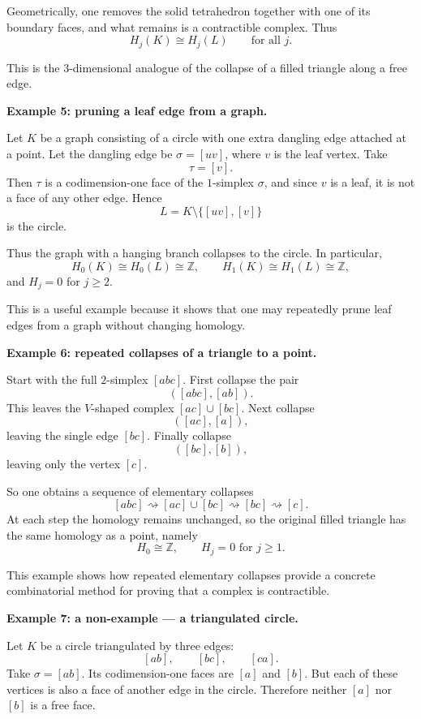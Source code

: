 \documentclass[12pt,a4paper]{article}
\theoremstyle{notespace}
\begin{document}
Geometrically, one removes the solid tetrahedron together with one of its boundary faces, and what remains is a contractible complex. Thus
\[
H_j(K)\cong H_j(L)
\qquad\text{for all } j.
\]

This is the \(3\)-dimensional analogue of the collapse of a filled triangle along a free edge.

\medskip

\textbf{Example 5: pruning a leaf edge from a graph.}

Let \(K\) be a graph consisting of a circle with one extra dangling edge attached at a point. Let the dangling edge be \(\sigma=[uv]\), where \(v\) is the leaf vertex. Take
\[
\tau=[v].
\]
Then \(\tau\) is a codimension-one face of the \(1\)-simplex \(\sigma\), and since \(v\) is a leaf, it is not a face of any other edge. Hence
\[
L=K\setminus\{[uv],[v]\}
\]
is the circle.

Thus the graph with a hanging branch collapses to the circle. In particular,
\[
H_0(K)\cong H_0(L)\cong \mathbb Z,
\qquad
H_1(K)\cong H_1(L)\cong \mathbb Z,
\]
and \(H_j=0\) for \(j\ge 2\).

This is a useful example because it shows that one may repeatedly prune leaf edges from a graph without changing homology.

\medskip

\textbf{Example 6: repeated collapses of a triangle to a point.}

Start with the full \(2\)-simplex \([abc]\). First collapse the pair
\[
([abc],[ab]).
\]
This leaves the \(V\)-shaped complex \([ac]\cup [bc]\). Next collapse
\[
([ac],[a]),
\]
leaving the single edge \([bc]\). Finally collapse
\[
([bc],[b]),
\]
leaving only the vertex \([c]\).

So one obtains a sequence of elementary collapses
\[
[abc] \rightsquigarrow [ac]\cup[bc] \rightsquigarrow [bc] \rightsquigarrow [c].
\]
At each step the homology remains unchanged, so the original filled triangle has the same homology as a point, namely
\[
H_0\cong \mathbb Z,\qquad H_j=0 \text{ for } j\ge 1.
\]

This example shows how repeated elementary collapses provide a concrete combinatorial method for proving that a complex is contractible.

\medskip

\textbf{Example 7: a non-example --- a triangulated circle.}

Let \(K\) be a circle triangulated by three edges:
\[
[ab],\qquad [bc],\qquad [ca].
\]
Take \(\sigma=[ab]\). Its codimension-one faces are \([a]\) and \([b]\). But each of these vertices is also a face of another edge in the circle. Therefore neither \([a]\) nor \([b]\) is a free face.
\end{document}
